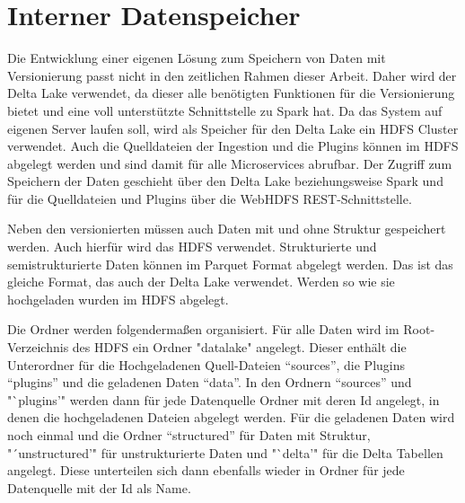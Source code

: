 \section{Interner Datenspeicher}

Die Entwicklung einer eigenen Lösung zum Speichern von Daten mit Versionierung passt nicht in den zeitlichen Rahmen dieser Arbeit.
Daher wird der Delta Lake verwendet, da dieser alle benötigten Funktionen für die Versionierung bietet und eine voll unterstützte Schnittstelle zu Spark hat.
Da das System auf eigenen Server laufen soll, wird als Speicher für den Delta Lake ein HDFS Cluster verwendet.
Auch die Quelldateien der Ingestion und die Plugins können im HDFS abgelegt werden und sind damit für alle Microservices abrufbar.
Der Zugriff zum Speichern der Daten geschieht über den Delta Lake beziehungsweise Spark und für die Quelldateien und Plugins über die WebHDFS REST-Schnittstelle.

Neben den versionierten müssen auch Daten mit und ohne Struktur gespeichert werden.
Auch hierfür wird das HDFS verwendet.
Strukturierte und semistrukturierte Daten können im Parquet Format abgelegt werden.
Das ist das gleiche Format, das auch der Delta Lake verwendet.
Werden so wie sie hochgeladen wurden im HDFS abgelegt.

Die Ordner werden folgendermaßen organisiert.
Für alle Daten wird im Root-Verzeichnis des HDFS ein Ordner "datalake" angelegt.
Dieser enthält die Unterordner für die Hochgeladenen Quell-Dateien "`sources"', die Plugins "`plugins"' und die geladenen Daten "`data"'.
In den Ordnern "`sources"' und "`plugins'" werden dann für jede Datenquelle Ordner mit deren Id angelegt, in denen die hochgeladenen Dateien abgelegt werden.
Für die geladenen Daten wird noch einmal und die Ordner "`structured"' für Daten mit Struktur, "´unstructured'" für unstrukturierte Daten und "`delta'" für die Delta Tabellen angelegt.
Diese unterteilen sich dann ebenfalls wieder in Ordner für jede Datenquelle mit der Id als Name.
